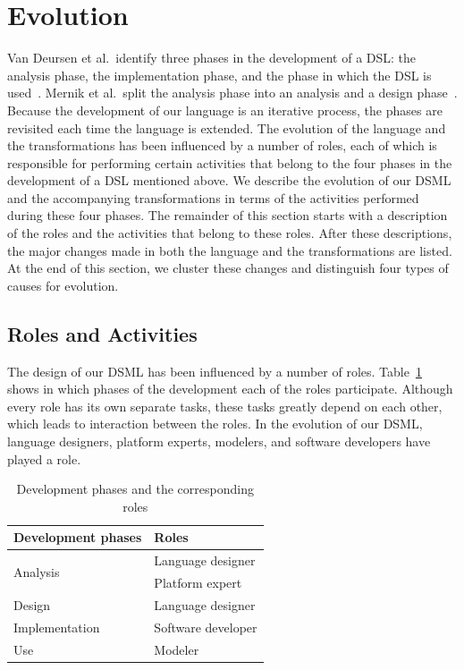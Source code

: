 \section{Evolution}
\label{sec:iterative-dsl-evolution:SLCO_Evolution}
Van Deursen et al.\ identify three phases in the development of a DSL: the analysis phase, the implementation phase, and the phase in which the DSL is used~\cite{Deursen2000}.
Mernik et al.\ split the analysis phase into an analysis and a design phase~\cite{Mernik2005}.
Because the development of our language is an iterative process, the phases are revisited each time the language is extended.
The evolution of the language and the transformations has been influenced by a number of roles, each of which is responsible for performing certain activities that belong to the four phases in the development of a DSL mentioned above.
We describe the evolution of our DSML and the accompanying transformations in terms of the activities performed during these four phases.
The remainder of this section starts with a description of the roles and the activities that belong to these roles.
After these descriptions, the major changes made in both the language and the transformations are listed.
At the end of this section, we cluster these changes and distinguish four types of causes for evolution.

\subsection{Roles and Activities}
\label{sec:iterative-dsl-evolution:SLCO_Evolution_Roles}

The design of our DSML has been influenced by a number of roles.
Table~\ref{tab:roles_phases} shows in which phases of the development each of the roles participate.
Although every role has its own separate tasks, these tasks greatly depend on each other, which leads to interaction between the roles.
In the evolution of our DSML, language designers, platform experts, modelers, and software developers have played a role.

\begin{table}[hbt]
\centering
\small
\begin{tabular}{|l|l|}
\hline
\rowcolor[gray]{.9}
\textbf{Development phases} & \textbf{Roles} \\
\hline
\multirow{2}{*}{Analysis}   & Language designer \\
                            & Platform expert \\
\hline
Design                      & Language designer \\
\hline
Implementation              & Software developer \\
\hline
Use                         & Modeler \\
\hline
\end{tabular}
\caption{Development phases and the corresponding roles}
\label{tab:roles_phases}
\end{table}

